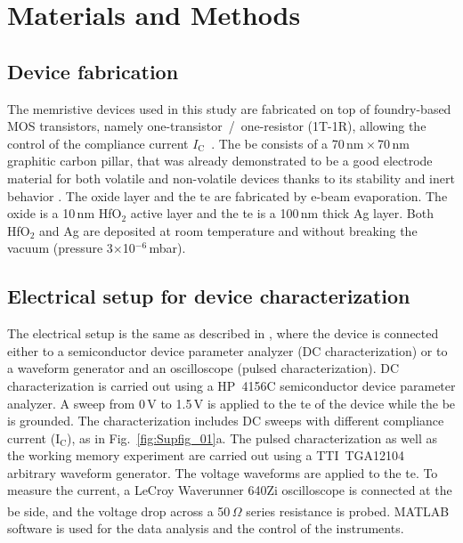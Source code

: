 \section{Materials and Methods}

\subsection{Device fabrication}
\label{ssec:dev_fab}
The memristive devices used in this study are fabricated on top of foundry-based MOS transistors, namely one-transistor~/~one-resistor (1T-1R), allowing the control of the compliance current $I_\mathrm{C}$~\cite{bricalli2018TED-I}. The \gls{be} consists of a 70\,nm\,$\times$\,70\,nm graphitic carbon pillar, that was already demonstrated to be a good electrode material for both volatile and non-volatile devices thanks to its stability and inert behavior \cite{covi2021TED-I}. The oxide layer and the \gls{te} are fabricated by e-beam evaporation. The oxide is a 10\,nm HfO$\mathrm{_2}$ active layer and the \gls{te} is a 100\,nm thick Ag layer. Both HfO$\mathrm{_2}$ and Ag are deposited at room temperature and without breaking the vacuum (pressure 3$\times$10$\mathrm{^{-6}}$\,mbar).


\subsection{Electrical setup for device characterization}

The electrical setup is the same as described in \cite{covi2021TED-I}, where the device is connected either to a semiconductor device parameter analyzer (DC characterization) or to a waveform generator and an oscilloscope (pulsed characterization). DC characterization is carried out using a HP~4156C semiconductor device parameter analyzer. A sweep from 0\,V to 1.5\,V is applied to the \gls{te} of the device while the \gls{be} is grounded. The characterization includes DC sweeps with different compliance current (I$\mathrm{_C}$), as in Fig.~\ref{fig:Supfig_01}a. The pulsed characterization as well as the working memory experiment are carried out using a TTI~TGA12104 arbitrary waveform generator. The voltage waveforms are applied to the \gls{te}. To measure the current, a LeCroy Waverunner 640Zi oscilloscope is connected at the \gls{be} side, and the voltage drop across a 50\,$\Omega$ series resistance is probed. MATLAB\textsuperscript{\textregistered} software is used for the data analysis and the control of the instruments.

